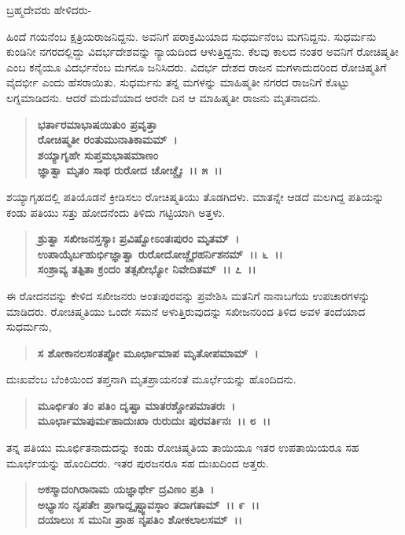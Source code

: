 \begin{flushleft}
ಬ್ರಹ್ಮದೇವರು ಹೇಳಿದರು-
\end{flushleft}

ಹಿಂದೆ ಗಯನೆಂಬ ಕ್ಷತ್ರಿಯರಾಜನಿದ್ದನು. ಅವನಿಗೆ ಪರಾಕ್ರಮಿಯಾದ ಸುಧರ್ಮನೆಂಬ ಮಗನಿದ್ದನು. ಸುಧರ್ಮನು ಕುಂಡಿನೀ ನಗರದಲ್ಲಿದ್ದು ವಿದರ್ಭದೇಶವನ್ನು ನ್ಯಾಯದಿಂದ ಆಳುತ್ತಿದ್ದನು. ಕೆಲವು ಕಾಲದ ನಂತರ ಅವನಿಗೆ ರೋಚಿಷ್ಮತೀ ಎಂಬ ಕನೈಯೂ ವಿದರ್ಭನೆಂಬ ಮಗನೂ ಜನಿಸಿದರು. ವಿದರ್ಭ ದೇಶದ ರಾಜನ ಮಗಳಾದುದರಿಂದ ರೋಚಿಷ್ಮತಿಗೆ ವೈದರ್ಭೀ ಎಂದು ಹೆಸರಾಯಿತು. ಸುಧರ್ಮನು ತನ್ನ ಮಗಳನ್ನು ಮಾಹಿಷ್ಮತೀ ನಗರದ ರಾಜನಿಗೆ ಕೊಟ್ಟು ಲಗ್ನಮಾಡಿದನು. ಆದರೆ ಮದುವೆಯಾದ ಆರನೇ ದಿನ ಆ ಮಾಹಿಷ್ಮತೀ ರಾಜನು ಮೃತನಾದನು.

\begin{verse}
\textbf{ಭರ್ತಾರಮಾಭಾಷಯಿತುಂ ಪ್ರವೃತ್ತಾ} \\\textbf{ರೋಚಿಷ್ಮತೀ ರಂತುಮುನಾತಿಕಾಮಮ್~।}\\\textbf{ಶಯ್ಯಾಗೃಹೇ ಸುಪ್ತಮಭಾಷಮಾಣಂ }\\\textbf{ಜ್ಞಾತ್ವಾ ಮೃತಂ ಸಾಥ ರುರೋದ ಚೋಚ್ಚೈಃ~।। ೫~।।}
\end{verse}

ಶಯ್ಯಾಗೃಹದಲ್ಲಿ ಪತಿಯೊಡನೆ ಕ್ರೀಡಿಸಲು ರೋಚಿಷ್ಮತಿಯು ತೊಡಗಿದಳು. ಮಾತನ್ನೇ ಆಡದೆ ಮಲಗಿದ್ದ ಪತಿಯನ್ನು ಕಂಡು ಪತಿಯು ಸತ್ತು ಹೋದನೆಂದು ತಿಳಿದು ಗಟ್ಟಿಯಾಗಿ ಅತ್ತಳು.

\begin{verse}
\textbf{ಶ್ರುತ್ವಾ ಸಖೀಜನಸ್ತಸ್ಯಾಃ ಪ್ರವಿಷ್ವೋಽಂತಃಪುರಂ ಮೃತಮ್~।}\\\textbf{ಉಪಾಯೈರ್ಬಹುರ್ಭಿಜ್ಞಾತ್ವಾ ರುರೋದೋಚ್ಚೈರಹರ್ನಿಶನಮ್~।। ೬~।।}\\\textbf{ಸಂಶ್ರಾವ್ಯ ತತ್ಪಿತಾ ಕ್ರಂದಂ ತತ್ಸಖೀಭ್ಯೋ ನಿವೇದಿತಮ್~।। ೭~।।}
\end{verse}

ಈ ರೋದನವನ್ನು ಕೇಳಿದ ಸಖೀಜನರು ಅಂತಃಪುರವನ್ನು ಪ್ರವೇಶಿಸಿ ಮತನಿಗೆ ನಾನಾಬಗೆಯ ಉಪಚಾರಗಳನ್ನು ಮಾಡಿದರು. ರೋಚಿಷ್ಮತಿಯು ಒಂದೇ ಸಮನೆ ಅಳುತ್ತಿರುವುದನ್ನು ಸಖೀಜನರಿಂದ ತಿಳಿದ ಅವಳ ತಂದೆಯಾದ ಸುಧರ್ಮನು,

\begin{verse}
\textbf{ಸ ಶೋಕಾನಲಸಂತಪ್ಪೋ ಮೂರ್ಛಾಮಾಪ ಮೃತೋಪಮಾಮ್~।}
\end{verse}

ದುಃಖವೆಂಬ ಬೆಂಕಿಯಿಂದ ತಪ್ತನಾಗಿ ಮೃತಪ್ರಾಯನಂತೆ ಮೂರ್ಛೆಯನ್ನು ಹೊಂದಿದನು.

\begin{verse}
\textbf{ಮೂರ್ಛಿತಂ ತಂ ಪತಿಂ ದೃಷ್ಟಾ ಮಾತರಶ್ಚೋಪಮಾತರಃ~।}\\\textbf{ಮೂರ್ಛಾಮಾಪುರ್ಮಹಾದುಃಖಾ ರುರುದುಃ ಪುರವರ್ತಿನಃ~।। ೮~।।}
\end{verse}

ತನ್ನ ಪತಿಯು ಮೂರ್ಛಿತನಾದುದನ್ನು ಕಂಡು ರೋಚಿಷ್ಮತಿಯ ತಾಯಿಯೂ ಇತರ ಉಪತಾಯಿಯರೂ ಸಹ ಮೂರ್ಛೆಯನ್ನು ಹೊಂದಿದರು. ಇತರ ಪುರಜನರೂ ಸಹ ದುಃಖದಿಂದ ಅತ್ತರು.

\begin{verse}
\textbf{ಅಕಸ್ಮಾದಂಗಿರಾನಾಮ ಯಜ್ಞಾರ್ಥೇ ದ್ರವಿಣಂ ಪ್ರತಿ~।}\\\textbf{ಅಭ್ಯಾಸಂ ನೃಪತೇಃ ಪ್ರಾಗಾದ್ದೃಷ್ಟ್ವಾವಸ್ಠಾಂ ತದಾಗತಾಮ್~।। ೯~।। }\\\textbf{ದಯಾಲುಃ ಸ ಮುನಿಃ ಪ್ರಾಹ ನೃಪತಿಂ ಶೋಕಲಾಲಸಮ್~।।}
\end{verse}

